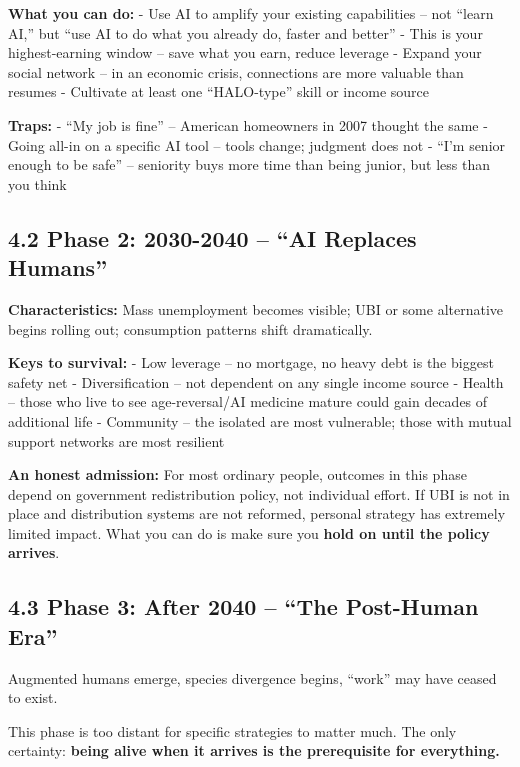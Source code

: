 \textbf{What you can do:} - Use AI to amplify your existing capabilities
-- not ``learn AI,'' but ``use AI to do what you already do, faster and
better'' - This is your highest-earning window -- save what you earn,
reduce leverage - Expand your social network -- in an economic crisis,
connections are more valuable than resumes - Cultivate at least one
``HALO-type'' skill or income source

\textbf{Traps:} - ``My job is fine'' -- American homeowners in 2007
thought the same - Going all-in on a specific AI tool -- tools change;
judgment does not - ``I'm senior enough to be safe'' -- seniority buys
more time than being junior, but less than you think

\subsection{4.2 Phase 2: 2030-2040 -- ``AI Replaces
Humans''}\label{phase-2-2030-2040-ai-replaces-humans}

\textbf{Characteristics:} Mass unemployment becomes visible; UBI or some
alternative begins rolling out; consumption patterns shift dramatically.

\textbf{Keys to survival:} - Low leverage -- no mortgage, no heavy debt
is the biggest safety net - Diversification -- not dependent on any
single income source - Health -- those who live to see age-reversal/AI
medicine mature could gain decades of additional life - Community -- the
isolated are most vulnerable; those with mutual support networks are
most resilient

\textbf{An honest admission:} For most ordinary people, outcomes in this
phase depend on government redistribution policy, not individual effort.
If UBI is not in place and distribution systems are not reformed,
personal strategy has extremely limited impact. What you can do is make
sure you \textbf{hold on until the policy arrives}.

\subsection{4.3 Phase 3: After 2040 -- ``The Post-Human
Era''}\label{phase-3-after-2040-the-post-human-era}

Augmented humans emerge, species divergence begins, ``work'' may have
ceased to exist.

This phase is too distant for specific strategies to matter much. The
only certainty: \textbf{being alive when it arrives is the prerequisite
for everything.}

